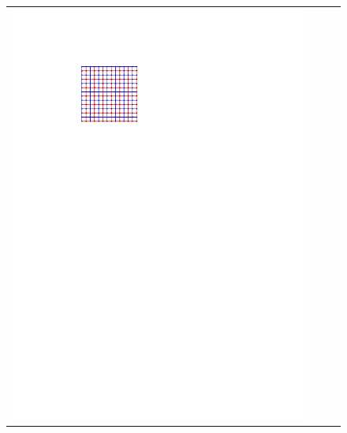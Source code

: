 \documentclass{patmorin}
\begin{document}
\begin{figure}
  \centering
  \begin{tabular}{cccc}
    \includegraphics[page=1]{figs/omer} &

\end{tabular}
\end{figure}
\end{document}

